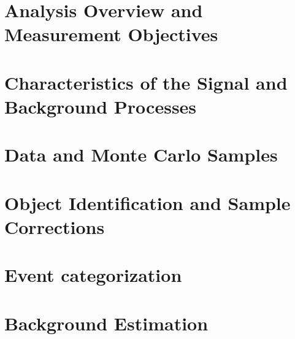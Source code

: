 

\section{Analysis Overview and Measurement Objectives}
\label{sec:analysis-overview}


\section{Characteristics of the Signal and Background Processes}
\label{sec:signal-bkg-characteristics}



\section{Data and Monte Carlo Samples}
\label{sec:data-mc-samples}



\section{Object Identification and Sample Corrections}
\label{sec:object-selection}



\section{Event categorization}
\label{sec:event-categorization}



\section{Background Estimation}
\label{sec:bkg-estimation}


